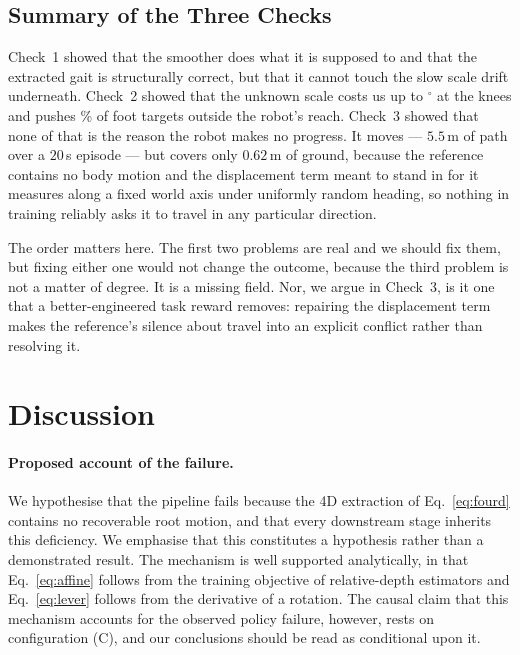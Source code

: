 \documentclass{article}
\theoremstyle{plain}
\theoremstyle{definition}
\theoremstyle{remark}
\begin{document}
\subsection{Summary of the Three Checks}
 
Check~1 showed that the smoother does what it is supposed to and that the
extracted gait is structurally correct, but that it cannot touch the slow scale
drift underneath. Check~2 showed that the unknown scale costs us up to
$^\circ$ at the knees and pushes \% of foot targets outside the
robot's reach. Check~3 showed that none of that is the reason the robot makes
no progress. It moves --- $5.5$\,m of path over a $20$\,s episode --- but
covers only $0.62$\,m of ground, because the reference contains no body motion
and the displacement term meant to stand in for it measures along a fixed
world axis under uniformly random heading, so nothing in training reliably
asks it to travel in any particular direction.

The order matters here. The first two problems are real and we should fix them,
but fixing either one would not change the outcome, because the third problem
is not a matter of degree. It is a missing field. Nor, we argue in Check~3, is
it one that a better-engineered task reward removes: repairing the
displacement term makes the reference's silence about travel into an explicit
conflict rather than resolving it.


\section{Discussion}
\label{sec:discussion}
 
\paragraph{Proposed account of the failure.} We hypothesise that the pipeline
fails because the 4D extraction of Eq.~\eqref{eq:fourd} contains no
recoverable root motion, and that every downstream stage inherits this
deficiency. We emphasise that this constitutes a hypothesis rather than a
demonstrated result. The mechanism is well supported analytically, in that
Eq.~\eqref{eq:affine} follows from the training objective of relative-depth
estimators and Eq.~\eqref{eq:lever} follows from the derivative of a rotation.
The causal claim that this mechanism accounts for the observed policy failure,
however, rests on configuration (C), and our conclusions should be read as
conditional upon it.
 
\end{document}

